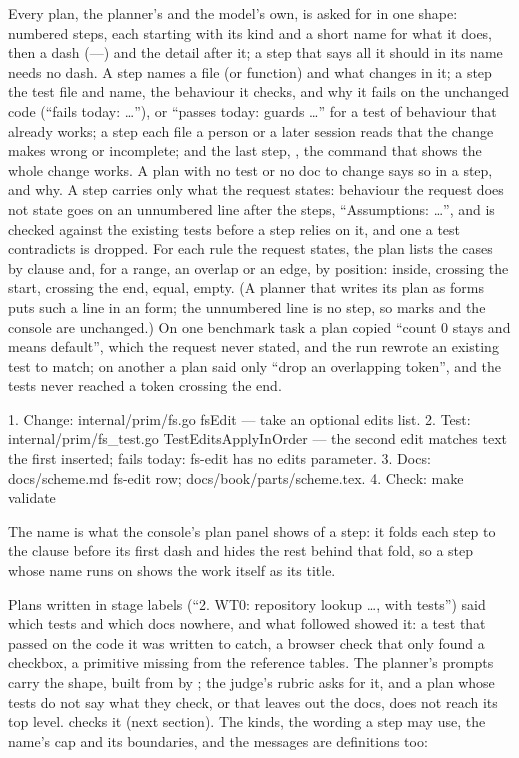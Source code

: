 Every plan, the planner's and the model's own, is asked for in one shape:
numbered steps, each starting with its kind and a short name for what it
does, then a dash (—) and the detail after it; a step that says all it
should in its name needs no dash. A  step names a
file (or function) and what changes in it; a  step the test
file and name, the behaviour it checks, and why it fails on the unchanged
code (``fails today: \ldots''), or ``passes today: guards \ldots'' for a
test of behaviour that already works; a  step each file a
person or a later session reads that the change makes wrong or incomplete;
and the last step, , the command that shows the whole change
works. A plan with no test or no doc to change says so in a step, and why.
A step carries only what the request states: behaviour the request does not
state goes on an unnumbered line after the steps, ``Assumptions: \ldots'',
and is checked against the existing tests before a step relies on it, and
one a test contradicts is dropped. For each rule the request states, the
plan lists the cases by clause and, for a range, an overlap or an edge, by
position: inside, crossing the start, crossing the end, equal, empty. (A
planner that writes its plan as forms puts such a line in an
 form; the unnumbered line is no step, so marks and the
console are unchanged.) On one benchmark task a plan copied ``count 0
stays and means default'', which the request never stated, and the run
rewrote an existing test to match; on another a plan said only ``drop an
overlapping token'', and the tests never reached a token crossing the end.

\begin{txt}
1. Change: internal/prim/fs.go fsEdit — take an optional edits list.
2. Test: internal/prim/fs_test.go TestEditsApplyInOrder — the second edit
   matches text the first inserted; fails today: fs-edit has no edits
   parameter.
3. Docs: docs/scheme.md fs-edit row; docs/book/parts/scheme.tex.
4. Check: make validate
\end{txt}

The name is what the console's plan panel shows of a step: it folds each
step to the clause before its first dash and hides the rest behind that
fold, so a step whose name runs on shows the work itself as its title.

Plans written in stage labels (``2. WT0: repository lookup \ldots, with
tests'') said which tests and which docs nowhere, and what followed showed
it: a test that passed on the code it was written to catch, a browser check
that only found a checkbox, a primitive missing from the reference tables.
The planner's prompts carry the shape, built from  by
; the judge's rubric asks for it, and a plan whose tests
do not say what they check, or that leaves out the docs, does not reach its
top level.  checks it (next section). The kinds, the
wording a  step may use, the name's cap and its boundaries,
and the messages are definitions too:


